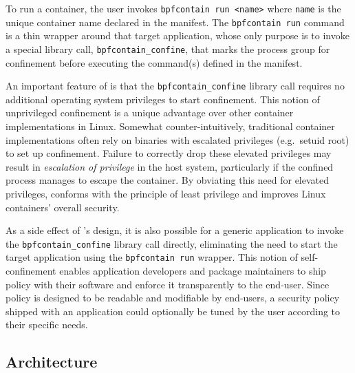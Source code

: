 To run a \bpfcontain{} container, the user invokes \texttt{bpfcontain run <name>} where
\texttt{name} is the unique container name declared in the manifest.  The
\texttt{bpfcontain run} command is a thin wrapper around that target application,
whose only purpose is to invoke a special library call,
\lstinline[language=c]|bpfcontain_confine|, that marks the process group for
confinement before executing the command(s) defined in the manifest.

An important feature of \bpfcontain{} is that the
\lstinline[language=c]|bpfcontain_confine| library call requires no additional
operating system privileges to start confinement.  This notion of unprivileged
confinement is a unique advantage over other container implementations in Linux.
Somewhat counter-intuitively, traditional container implementations often rely
on binaries with escalated privileges (e.g.~setuid root) to set up confinement.
Failure to correctly drop these elevated privileges may result in
\textit{escalation of privilege} in the host system, particularly if the
confined process manages to escape the container.  By obviating this need for
elevated privileges, \bpfcontain{} conforms with the principle of least
privilege and improves Linux containers' overall security.

As a side effect of \bpfcontain{}'s design, it is also possible for a generic
application to invoke the \lstinline[language=c]|bpfcontain_confine| library
call directly, eliminating the need to start the target application using the
\texttt{bpfcontain run} wrapper. This notion of self-confinement enables
application developers and package maintainers to ship \bpfcontain{} policy with
their software and enforce it transparently to the end-user. Since \bpfcontain{}
policy is designed to be readable and modifiable by end-users, a security policy
shipped with an application could optionally be tuned by the user according to
their specific needs.


\subsection{Architecture}

